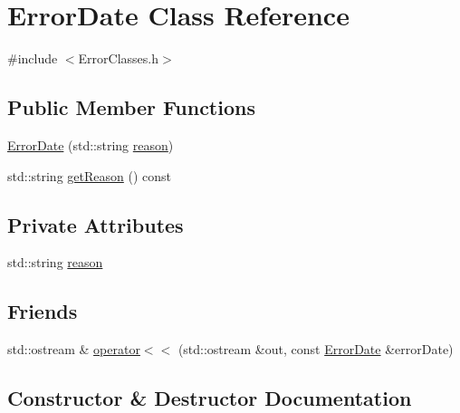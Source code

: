 \hypertarget{classErrorDate}{}\section{Error\+Date Class Reference}
\label{classErrorDate}


{\ttfamily \#include $<$Error\+Classes.\+h$>$}

\subsection*{Public Member Functions}
\begin{DoxyCompactItemize}
\item 
\hyperlink{classErrorDate_ad5270b865927bef403d77a5345461b8c}{Error\+Date} (std\+::string \hyperlink{classErrorDate_a9b8eff64d7dc5e415391bde2b7ebf2fa}{reason})
\item 
std\+::string \hyperlink{classErrorDate_ae73b23d56942a8247e177a8216349cbf}{get\+Reason} () const 
\end{DoxyCompactItemize}
\subsection*{Private Attributes}
\begin{DoxyCompactItemize}
\item 
std\+::string \hyperlink{classErrorDate_a9b8eff64d7dc5e415391bde2b7ebf2fa}{reason}
\end{DoxyCompactItemize}
\subsection*{Friends}
\begin{DoxyCompactItemize}
\item 
std\+::ostream \& \hyperlink{classErrorDate_a849204bdefa4115b58786e772f50ec1e}{operator$<$$<$} (std\+::ostream \&out, const \hyperlink{classErrorDate}{Error\+Date} \&error\+Date)
\end{DoxyCompactItemize}


\subsection{Constructor \& Destructor Documentation}
